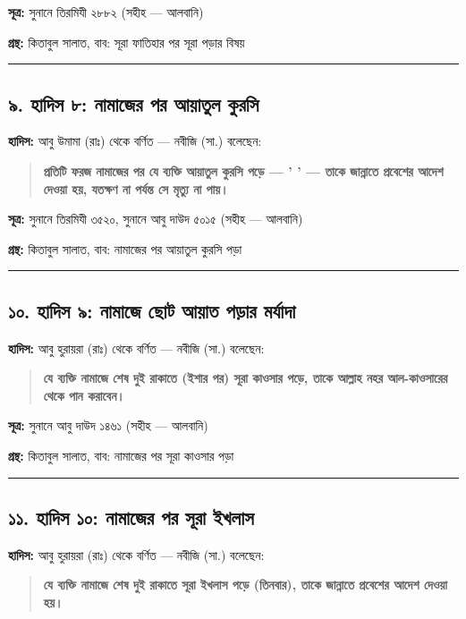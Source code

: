 \textbf{সূত্র:} সুনানে তিরমিযী ২৮৮২ (সহীহ — আলবানি)

\textbf{গ্রন্থ:} কিতাবুল সালাত, বাব: সূরা ফাতিহার পর সূরা পড়ার বিষয়

\medskip\hrule\medskip

\subsection*{৯. হাদিস ৮: নামাজের পর আয়াতুল কুরসি}

\textbf{হাদিস:} আবু উমামা (রাঃ) থেকে বর্ণিত — নবীজি (সা.) বলেছেন:

\begin{quote}
\textbf{প্রতিটি ফরজ নামাজের পর যে ব্যক্তি আয়াতুল কুরসি পড়ে — '      ' — তাকে জান্নাতে প্রবেশের আদেশ দেওয়া হয়, যতক্ষণ না পর্যন্ত সে মৃত্যু না পায়।}
\end{quote}

\textbf{সূত্র:} সুনানে তিরমিযী ৩৫২০, সুনানে আবু দাউদ ৫০১৫ (সহীহ — আলবানি)

\textbf{গ্রন্থ:} কিতাবুল সালাত, বাব: নামাজের পর আয়াতুল কুরসি পড়া

\medskip\hrule\medskip

\subsection*{১০. হাদিস ৯: নামাজে ছোট আয়াত পড়ার মর্যাদা}

\textbf{হাদিস:} আবু হুরায়রা (রাঃ) থেকে বর্ণিত — নবীজি (সা.) বলেছেন:

\begin{quote}
\textbf{যে ব্যক্তি নামাজে শেষ দুই রাকাতে (ইশার পর) সূরা কাওসার পড়ে, তাকে আল্লাহ নহর আল-কাওসারের থেকে পান করাবেন।}
\end{quote}

\textbf{সূত্র:} সুনানে আবু দাউদ ১৪৬১ (সহীহ — আলবানি)

\textbf{গ্রন্থ:} কিতাবুল সালাত, বাব: নামাজের পর সূরা কাওসার পড়া

\medskip\hrule\medskip

\subsection*{১১. হাদিস ১০: নামাজের পর সূরা ইখলাস}

\textbf{হাদিস:} আবু হুরায়রা (রাঃ) থেকে বর্ণিত — নবীজি (সা.) বলেছেন:

\begin{quote}
\textbf{যে ব্যক্তি নামাজে শেষ দুই রাকাতে সূরা ইখলাস পড়ে (তিনবার), তাকে জান্নাতে প্রবেশের আদেশ দেওয়া হয়।}
\end{quote}

